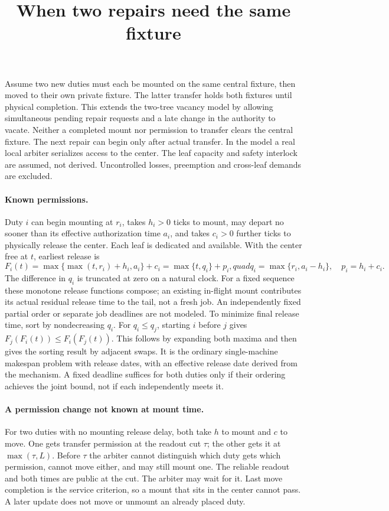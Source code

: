 \documentclass{article}
\title{When two repairs need the same fixture}
\date{}
\begin{document}
\maketitle
Assume two new duties must each be mounted on the same central
fixture, then moved to their own private fixture. The latter transfer
holds both fixtures until physical completion. This extends the
two-tree vacancy model by allowing simultaneous pending repair
requests and a late change in the authority to vacate. Neither a
completed mount nor permission to transfer clears the central
fixture. The next repair can begin only after actual transfer.
In the model a real local arbiter serializes access to the center.
The leaf capacity and safety interlock are assumed, not derived.
Uncontrolled losses, preemption and cross-leaf demands are excluded.

\paragraph{Known permissions.}
Duty $i$ can begin mounting at $r_i$, takes $h_i>0$ ticks to mount,
may depart no sooner than its effective authorization time $a_i$,
and takes $c_i>0$ further ticks to physically release the center.
Each leaf is dedicated and available. With the center free at $t$,
earliest release is
\[
 F_i(t)=\max\{\max(t,r_i)+h_i,a_i\}+c_i
       =\max\{t,q_i\}+p_i,quad
 q_i=\max\{r_i,a_i-h_i\},\quad p_i=h_i+c_i .
\]
The difference in $q_i$ is truncated at zero on a natural clock.
For a fixed sequence these monotone release functions compose;
an existing in-flight mount contributes its actual residual
release time to the tail, not a fresh job. An independently
fixed partial order or separate job deadlines are not modeled.
To minimize final release time, sort by nondecreasing $q_i$.
For $q_i\le q_j$, starting $i$ before $j$ gives
$F_j(F_i(t))\le F_i(F_j(t))$. This follows by expanding both
maxima and then gives the sorting result by adjacent swaps.
It is the ordinary single-machine makespan problem with release
dates, with an effective release date derived from the mechanism.
A fixed deadline suffices for both duties only if their ordering
achieves the joint bound, not if each independently meets it.

\paragraph{A permission change not known at mount time.}
For two duties with no mounting release delay, both take $h$ to
mount and $c$ to move. One gets transfer permission at the
readout cut $\tau$; the other gets it at $\max(\tau,L)$.
Before $\tau$ the arbiter cannot distinguish which duty gets
which permission, cannot move either, and may still mount one.
The reliable readout and both times are public at the cut. The
arbiter may wait for it. Last move completion is the service
criterion, so a mount that sits in the center cannot pass.
A later update does not move or unmount an already placed duty.
\end{document}

